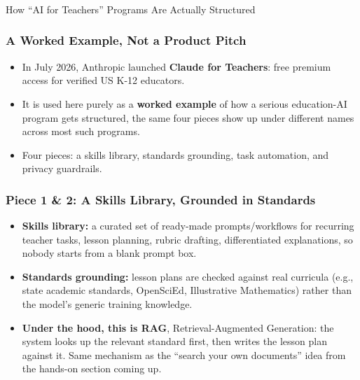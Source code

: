 \begin{frame}[fragile]\frametitle{}
\begin{center}
{\Large How ``AI for Teachers'' Programs Are Actually Structured}
\end{center}
\end{frame}

\begin{frame}[fragile]\frametitle{A Worked Example, Not a Product Pitch}
\begin{itemize}
\item In July 2026, Anthropic launched \textbf{Claude for Teachers}: free premium access for verified US K-12 educators.
\item It is used here purely as a \textbf{worked example} of how a serious education-AI program gets structured, the same four pieces show up under different names across most such programs.
\item Four pieces: a skills library, standards grounding, task automation, and privacy guardrails.
\end{itemize}
\end{frame}

\begin{frame}[fragile]\frametitle{Piece 1 \& 2: A Skills Library, Grounded in Standards}
\begin{itemize}
\item \textbf{Skills library:} a curated set of ready-made prompts/workflows for recurring teacher tasks, lesson planning, rubric drafting, differentiated explanations, so nobody starts from a blank prompt box.
\item \textbf{Standards grounding:} lesson plans are checked against real curricula (e.g., state academic standards, OpenSciEd, Illustrative Mathematics) rather than the model's generic training knowledge.
\item \textbf{Under the hood, this is RAG}, Retrieval-Augmented Generation: the system looks up the relevant standard first, then writes the lesson plan against it. Same mechanism as the ``search your own documents'' idea from the hands-on section coming up.
\end{itemize}
\end{frame}

